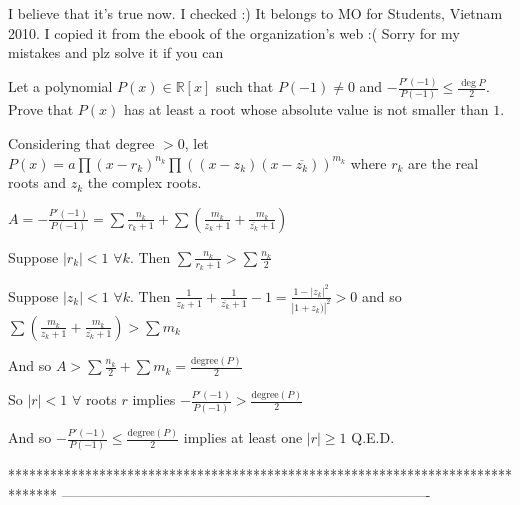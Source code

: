 


\begin{solution}
	I believe that it's true now. I checked  :)  It belongs to MO for Students, Vietnam 2010. 
I copied it from the ebook of the organization's web  :( 
Sorry for my mistakes and plz solve it if you can  
\end{solution}



\begin{solution}
	\begin{tcolorbox}Let a polynomial $P(x)\in \mathbb R[x]$ such that $P(-1)\ne 0$ and $-\frac{P'(-1)}{P(-1)} \le \frac{\deg P}{2}$. Prove that $P(x)$ has at least a root whose absolute value is not smaller than $1$.\end{tcolorbox}
Considering that degree $>0$, let $P(x)=a\prod(x-r_k)^{n_k}\prod\left((x-z_k)(x-\overline{z_k})\right)^{m_k}$ where $r_k$ are the real roots and $z_k$ the complex roots.

$A=-\frac{P'(-1)}{P(-1)}=\sum\frac {n_k}{r_k+1}+\sum\left(\frac{m_k}{z_k+1}+\frac{m_k}{\overline{z_k}+1}\right)$

Suppose $|r_k|<1$ $\forall k$. Then $\sum\frac {n_k}{r_k+1}>\sum\frac{n_k}2$

Suppose $|z_k|<1$ $\forall k$. Then $\frac{1}{z_k+1}+\frac{1}{\overline{z_k}+1}-1=\frac {1-|z_k|^2}{|1+z_k)|^2}>0$ and so $\sum\left(\frac{m_k}{z_k+1}+\frac{m_k}{\overline{z_k}+1}\right)>\sum m_k$

And so $A>\sum\frac{n_k}2+\sum m_k=\frac{\text{degree}(P)}2$

So $|r|<1$ $\forall $ roots $r$ implies $-\frac{P'(-1)}{P(-1)}>\frac{\text{degree}(P)}2$

And so $-\frac{P'(-1)}{P(-1)}\le\frac{\text{degree}(P)}2$ implies at least one $|r|\ge 1$
Q.E.D.
\end{solution}
*******************************************************************************
-------------------------------------------------------------------------------

